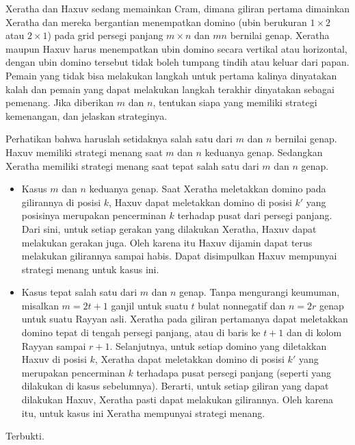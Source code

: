 \documentclass[12pt]{scrartcl}
\begin{document}
\begin{soaljawab}
Xeratha dan Haxuv sedang memainkan Cram, dimana giliran pertama dimainkan Xeratha dan mereka bergantian menempatkan domino (ubin berukuran $1 \times 2$ atau $2 \times 1$) pada grid persegi panjang $m \times n$ dan $mn$ bernilai genap. Xeratha maupun Haxuv harus menempatkan ubin domino secara vertikal atau horizontal, dengan ubin domino tersebut tidak boleh tumpang tindih atau keluar dari papan. Pemain yang tidak bisa melakukan langkah untuk pertama kalinya dinyatakan kalah dan pemain yang dapat melakukan langkah terakhir dinyatakan sebagai pemenang. Jika diberikan $m$ dan $n$, tentukan siapa yang memiliki strategi kemenangan, dan jelaskan strateginya.
    \begin{solusi}
        Perhatikan bahwa haruslah setidaknya salah satu dari $m$ dan $n$ bernilai genap. Haxuv memiliki strategi menang saat $m$ dan $n$ keduanya genap. Sedangkan Xeratha memiliki strategi menang saat tepat salah satu dari $m$ dan $n$ genap.
        \begin{itemize}
            \item Kasus $m$ dan $n$ keduanya genap. Saat Xeratha meletakkan domino pada gilirannya di posisi $k$, Haxuv dapat meletakkan domino di posisi $k'$ yang posisinya merupakan pencerminan $k$ terhadap pusat dari persegi panjang. Dari sini, untuk setiap gerakan yang dilakukan Xeratha, Haxuv dapat melakukan gerakan juga. Oleh karena itu Haxuv dijamin dapat terus melakukan gilirannya sampai habis. Dapat disimpulkan Haxuv mempunyai strategi menang untuk kasus ini.
            \item Kasus tepat salah satu dari $m$ dan $n$ genap. Tanpa mengurangi keumuman, misalkan $m=2t+1$ ganjil untuk suatu $t$ bulat nonnegatif dan $n=2r$ genap untuk suatu Rayyan asli. Xeratha pada giliran pertamanya dapat meletakkan domino tepat di tengah persegi panjang, atau di baris ke $t+1$ dan di kolom Rayyan sampai $r+1$. Selanjutnya, untuk setiap domino yang diletakkan Haxuv di posisi $k$, Xeratha dapat meletakkan domino di posisi $k'$ yang merupakan pencerminan $k$ terhadapa pusat persegi panjang (seperti yang dilakukan di kasus sebelumnya). Berarti, untuk setiap giliran yang dapat dilakukan Haxuv, Xeratha pasti dapat melakukan gilirannya. Oleh karena itu, untuk kasus ini Xeratha mempunyai strategi menang.
        \end{itemize}
        Terbukti.
    \end{solusi}
\end{soaljawab}
\end{document}
